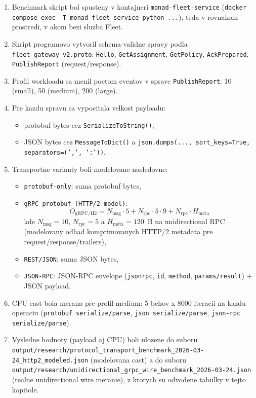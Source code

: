 \documentclass[12pt,a4paper]{report}
\begin{document}
\begin{enumerate}
  \item Benchmark skript bol spusteny v kontajneri
  \texttt{monad-fleet-service}
  (\texttt{docker compose exec -T monad-fleet-service python ...}),
  teda v rovnakom prostredi, v akom bezi sluzba Fleet.
  \item Skript programovo vytvoril schema-validne spravy podla
  \texttt{fleet\_gateway\_v2.proto}:
  \texttt{Hello}, \texttt{GetAssignment}, \texttt{GetPolicy},
  \texttt{AckPrepared}, \texttt{PublishReport} (request/response).
  \item Profil workloadu sa menil poctom eventov v sprave
  \texttt{PublishReport}: 10 (small), 50 (medium), 200 (large).
  \item Pre kazdu spravu sa vypocitala velkost payloadu:
  \begin{itemize}
    \item protobuf bytes cez \texttt{SerializeToString()},
    \item JSON bytes cez \texttt{MessageToDict()} a
    \texttt{json.dumps(..., sort\_keys=True, separators=(',', ':'))}.
  \end{itemize}
  \item Transportne varianty boli modelovane nasledovne:
  \begin{itemize}
    \item \texttt{protobuf-only}: suma protobuf bytes,
    \item \texttt{gRPC protobuf (HTTP/2 model)}:
    \begin{equation}
    O_{\text{gRPC/H2}} =
    N_{\text{msg}}\cdot5 +
    N_{\text{rpc}}\cdot5\cdot9 +
    N_{\text{rpc}}\cdot H_{\text{meta}}
    \end{equation}
    kde $N_{\text{msg}}=10$, $N_{\text{rpc}}=5$ a
    $H_{\text{meta}}=120$~B na unidirectional RPC (modelovany odhad
    komprimovanych HTTP/2 metadata pre request/response/trailers),
    \item \texttt{REST/JSON}: suma JSON bytes,
    \item \texttt{JSON-RPC}: JSON-RPC envelope
    (\texttt{jsonrpc}, \texttt{id}, \texttt{method}, \texttt{params/result})
    + JSON payload.
  \end{itemize}
  \item CPU cast bola merana pre profil medium:
  5 behov x 8000 iteracii na kazdu operaciu
  (\texttt{protobuf serialize/parse}, \texttt{json serialize/parse},
  \texttt{json-rpc serialize/parse}).
  \item Vysledne hodnoty (payload aj CPU) boli ulozene do suboru
  \texttt{output/research/protocol\_transport\_benchmark\_2026-03-24\_http2\_modeled.json}
  (modelovana cast) a do suboru
  \texttt{output/research/unidirectional\_grpc\_wire\_benchmark\_2026-03-24.json}
  (realne unidirectional wire meranie), z ktorych su odvodene tabulky v tejto kapitole.
\end{enumerate}
\end{document}
